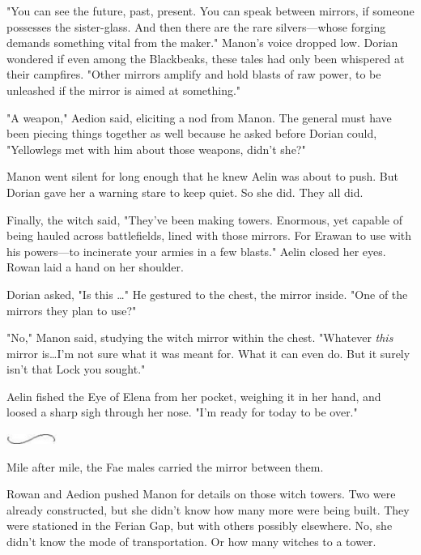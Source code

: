 "You can see the future, past, present.
You can speak between mirrors, if someone possesses the sister-glass.
And then there are the rare silvers---whose forging demands something vital from the maker."
Manon's voice dropped low.
Dorian wondered if even among the Blackbeaks, these tales had only been whispered at their campfires.
"Other mirrors amplify and hold blasts of raw power, to be unleashed if the mirror is aimed at something."

"A weapon," Aedion said, eliciting a nod from Manon.
The general must have been piecing things together as well because he asked before Dorian could, "Yellowlegs met with him about those weapons, didn't she?"

Manon went silent for long enough that he knew Aelin was about to push.
But Dorian gave her a warning stare to keep quiet.
So she did.
They all did.

Finally, the witch said, "They've been making towers.
Enormous, yet capable of being hauled across battlefields, lined with those mirrors.
For Erawan to use with his powers---to incinerate your armies in a few blasts."
Aelin closed her eyes.
Rowan laid a hand on her shoulder.

Dorian asked, "Is this \ldots" He gestured to the chest, the mirror inside.
"One of the mirrors they plan to use?"

"No," Manon said, studying the witch mirror within the chest.
"Whatever \emph{this} mirror is\ldots I'm not sure what it was meant for.
What it can even do.
But it surely isn't that Lock you sought."

Aelin fished the Eye of Elena from her pocket, weighing it in her hand, and loosed a sharp sigh through her nose.
"I'm ready for today to be over."

\begin{center}
	\includegraphics[width=0.65in,height=0.13in]{images/seperator}
\end{center}

Mile after mile, the Fae males carried the mirror between them.

Rowan and Aedion pushed Manon for details on those witch towers.
Two were already constructed, but she didn't know how many more were being built.
They were stationed in the Ferian Gap, but with others possibly elsewhere.
No, she didn't know the mode of transportation.
Or how many witches to a tower.


